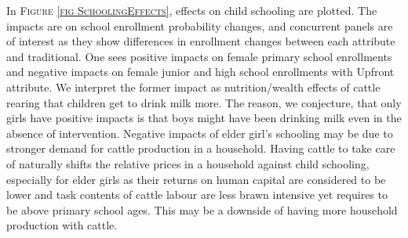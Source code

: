 \begin{figure}
\end{figure}

	In \textsc{\footnotesize Figure \ref{fig SchoolingEffects}}, effects on child schooling are plotted. The impacts are on school enrollment probability changes, and concurrent panels are of interest as they show differences in enrollment changes between each attribute and \textsf{traditional}. One sees positive impacts on female primary school enrollments and negative impacts on female junior and high school enrollments with \textsf{Upfront} attribute. We interpret the former impact as nutrition/wealth effects of cattle rearing that children get to drink milk more. The reason, we conjecture, that only girls have positive impacts is that boys might have been drinking milk even in the absence of intervention. Negative impacts of elder girl's schooling may be due to stronger demand for cattle production in a household. Having cattle to take care of naturally shifts the relative prices in a household against child schooling, especially for elder girls as their returns on human capital are considered to be lower and task contents of cattle labour are less brawn intensive yet requires to be above primary school ages. This may be a downside of having more household production with cattle.



